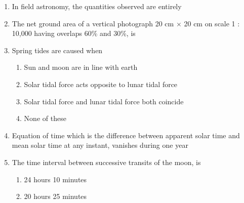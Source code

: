 \documentclass[11pt,a4paper]{article}
\begin{document}
\begin{enumerate}
\begin{enumerate}[label=\Alph*.]
\end{enumerate}
\item{In field astronomy, the quantities observed are entirely}
\\
\item{The net ground area of a vertical photograph 20 cm $\times$ 20 cm on scale 1 : 10,000 having overlaps 60\% and 30\%, is
}
\\
\item{Spring tides are caused when}
\begin{enumerate}[label=\Alph*.]
\item{Sun and moon are in line with earth}
\item{Solar tidal force acts opposite to lunar tidal force}
\item{Solar tidal force and lunar tidal force both coincide}
\item{None of these}
\end{enumerate}
\item{Equation of time which is the difference between apparent solar time and mean solar time at any instant, vanishes during one year}
\\
\item{The time interval between successive transits of the moon, is}
\begin{enumerate}[label=\Alph*.]
\item{24 hours 10 minutes}
\item{20 hours 25 minutes}

\end{enumerate}
\end{enumerate}
\end{document}
